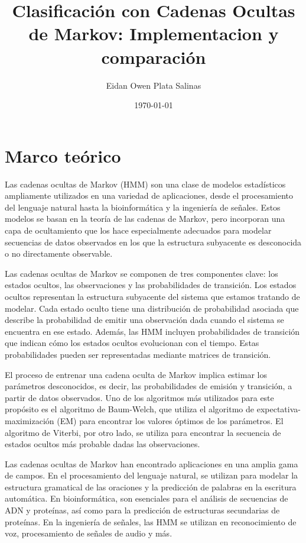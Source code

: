 \documentclass[12pt]{article}
\title{Clasificación con Cadenas Ocultas de Markov: Implementacion y comparación}
\author{Eidan Owen Plata Salinas}
\date{\today}
\begin{document}
\maketitle
\pagebreak



\section*{Marco teórico}

Las cadenas ocultas de Markov (HMM) son una clase de modelos estadísticos
ampliamente utilizados en una variedad de aplicaciones, desde el
procesamiento del lenguaje natural hasta la bioinformática y la ingeniería de
señales. Estos modelos se basan en la teoría de las cadenas de Markov, pero
incorporan una capa de ocultamiento que los hace especialmente adecuados
para modelar secuencias de datos observados en los que la estructura
subyacente es desconocida o no directamente observable.\vspace{1cm}


Las cadenas ocultas de Markov se componen de tres componentes clave: los
estados ocultos, las observaciones y las probabilidades de transición. Los
estados ocultos representan la estructura subyacente del sistema que estamos
tratando de modelar. Cada estado oculto tiene una distribución de probabilidad
asociada que describe la probabilidad de emitir una observación dada cuando
el sistema se encuentra en ese estado. Además, las HMM incluyen
probabilidades de transición que indican cómo los estados ocultos evolucionan
con el tiempo. Estas probabilidades pueden ser representadas mediante
matrices de transición.\vspace{1cm}


El proceso de entrenar una cadena oculta de Markov implica estimar los
parámetros desconocidos, es decir, las probabilidades de emisión y transición,
a partir de datos observados. Uno de los algoritmos más utilizados para este
propósito es el algoritmo de Baum-Welch, que utiliza el algoritmo de
expectativa-maximización (EM) para encontrar los valores óptimos de los
parámetros. El algoritmo de Viterbi, por otro lado, se utiliza para encontrar la
secuencia de estados ocultos más probable dadas las observaciones.\vspace{1cm}


Las cadenas ocultas de Markov han encontrado aplicaciones en una amplia
gama de campos. En el procesamiento del lenguaje natural, se utilizan para
modelar la estructura gramatical de las oraciones y la predicción de palabras
en la escritura automática. En bioinformática, son esenciales para el análisis
de secuencias de ADN y proteínas, así como para la predicción de estructuras
secundarias de proteínas. En la ingeniería de señales, las HMM se utilizan en
reconocimiento de voz, procesamiento de señales de audio y más.\vspace{1cm}
\end{document}
